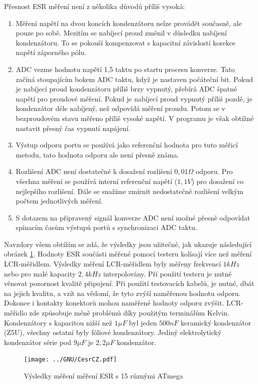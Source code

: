 Přesnost ESR měření není z několika důvodů příliš vysoká:
\begin{enumerate}
\item Měření napětí na dvou koncích kondenzátoru nelze provádět současně, ale pouze po sobě.
 Mezitím se nabíjecí proud změnil v důsledku nabíjení kondenzátoru.
To se pokouší kompenzovat s kapacitní závislostí korekce napětí záporného pólu.
\item  ADC vezme hodnotu napětí 1,5 taktu po startu procesu konverze. Tato začíná stoupajícím bokem ADC taktu, když je nastaven počáteční bit. Pokud je nabíjecí proud kondenzátoru příliš brzy vypnutý,
přebírá ADC špatné napětí pro proudové měření. Pokud je nabíjecí proud vypnutý příliš pozdě, je kondenzátor 
déle nabíjený, než odpovídá měření proudu. Potom se v bezproudovém stavu měřeno příliš vysoké napětí.
V programu je však obtížné nastavit přesný čas vypnutí napájení.
\item Výstup odporu portu se používá jako referenční hodnota pro tuto měřicí metodu, tato hodnota odporu
ale není přesně známa.
\item Rozlišení ADC není dostatečné k dosažení rozlišení \(0,01\Omega\) odporu.
Pro všechna měření se používá interní referenční napětí (\(1,1V\)) pro dosažení co nejlepšího rozlišení.
Dále se snažíme zmírnit nedostatečné rozlišení velkým počtem jednotlivých měření.
\item S dotazem na připravený signál konverze ADC není možné přesně odpovídat spínacím časům výstupů portů s
synchronizaci ADC taktu.
\end{enumerate}

 Navzdory všem obtížím se zdá, že výsledky jsou užitečné, jak ukazuje následující obrázek \ref{fig:Cesr}.
Hodnoty ESR součásti měřené pomocí testeru kolísají více než měření  LCR-měřidlem.
Výsledky měření LCR-měřidlem byly měřeny frekvencí \(1kHz\) nebo pro malé kapacity \(2,4kHz\) interpolovány.
Pří použití testeru je nutné věnovat pozornost kvalitě připojení.
Při použití testovacích kabelů, je nutné, dbát na jejich kvalitu, a vzít na vědomí,
že tyto zvýší naměřenou hodnotu odporu.
Dokonce i kontakty konektorů mohou naměřené hodnoty odporu zvýšit.
LCR-měřidlo zde způsobuje méně problémů díky použitým terminálům Kelvin.
Kondenzátory s kapacitou nižší než \(1\mu F\) byl jeden \(500nF\) keramický kondenzátor (Z5U), všechny ostatní byly fóliové kondenzátory. Jediný elektrolytický kondenzátor série pod \(9\mu F\) je \(2,2\mu F\) kondenzátor.

\begin{figure}[H]
\centering
\texttt{[image: ../GNU/CesrCZ.pdf]}
\caption{Výsledky měření měření ESR s 15 různými ATmega}
\label{fig:Cesr}
\end{figure}

